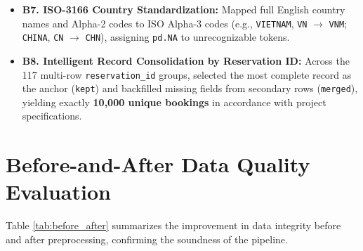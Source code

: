 \documentclass[12pt, a4paper]{report}
\newcommand{\code}[1]{\texttt{\small\color{DarkSlate}#1}}
\begin{document}
\begin{itemize}
  \item \textbf{B7. ISO-3166 Country Standardization:} Mapped full English country names and Alpha-2 codes to ISO Alpha-3 codes (e.g., \code{VIETNAM}, \code{VN} $\rightarrow$ \code{VNM}; \code{CHINA}, \code{CN} $\rightarrow$ \code{CHN}), assigning \code{pd.NA} to unrecognizable tokens.

  \item \textbf{B8. Intelligent Record Consolidation by Reservation ID:} Across the 117 multi-row \code{reservation\_id} groups, selected the most complete record as the anchor (\code{kept}) and backfilled missing fields from secondary rows (\code{merged}), yielding exactly \textbf{10,000 unique bookings} in accordance with project specifications.
\end{itemize}

\section{Before-and-After Data Quality Evaluation}

Table \ref{tab:before_after} summarizes the improvement in data integrity before and after preprocessing, confirming the soundness of the pipeline.
\end{document}
